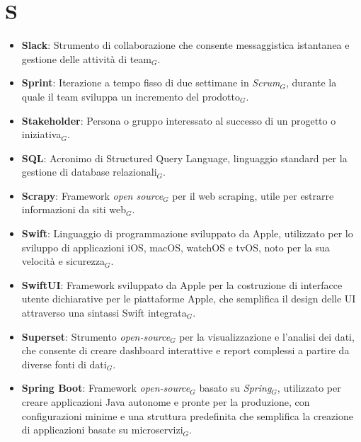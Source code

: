 \section{S}
\begin{itemize}
    \item \textbf{Slack}: Strumento di collaborazione che consente messaggistica istantanea e gestione delle attività di team$_G$.
    \item \textbf{Sprint}: Iterazione a tempo fisso di due settimane in \textit{Scrum}$_G$, durante la quale il team sviluppa un incremento del prodotto$_G$.
    \item \textbf{Stakeholder}: Persona o gruppo interessato al successo di un progetto o iniziativa$_G$.
    \item \textbf{SQL}: Acronimo di Structured Query Language, linguaggio standard per la gestione di database relazionali$_G$.
    \item \textbf{Scrapy}: Framework \textit{open source}$_G$ per il web scraping, utile per estrarre informazioni da siti web$_G$.
    \item \textbf{Swift}: Linguaggio di programmazione sviluppato da Apple, utilizzato per lo sviluppo di applicazioni iOS, macOS, watchOS e tvOS, noto per la sua velocità e sicurezza$_G$.
    \item \textbf{SwiftUI}: Framework sviluppato da Apple per la costruzione di interfacce utente dichiarative per le piattaforme Apple, che semplifica il design delle UI attraverso una sintassi Swift integrata$_G$.
    \item \textbf{Superset}: Strumento \textit{open-source}$_G$ per la visualizzazione e l'analisi dei dati, che consente di creare dashboard interattive e report complessi a partire da diverse fonti di dati$_G$.
    \item \textbf{Spring Boot}: Framework \textit{open-source}$_G$ basato su \textit{Spring}$_G$, utilizzato per creare applicazioni Java autonome e pronte per la produzione, con configurazioni minime e una struttura predefinita che semplifica la creazione di applicazioni basate su microservizi$_G$.

\end{itemize}
